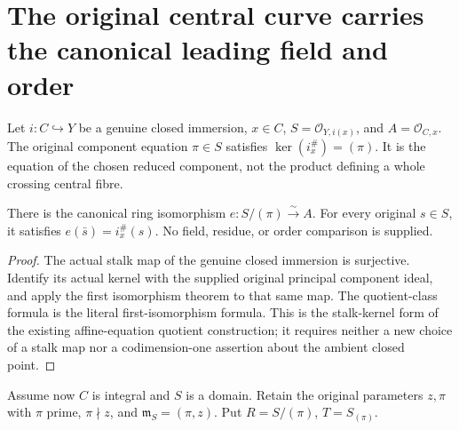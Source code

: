 \section{The original central curve carries the canonical leading field and order}

Let \(i:C\hookrightarrow Y\) be a genuine closed immersion, \(x\in C\),
\(S=\mathcal O_{Y,i(x)}\), and \(A=\mathcal O_{C,x}\).
The original component equation \(\pi\in S\) satisfies
\(\ker(i_x^\#)=(\pi)\). It is the equation of the chosen reduced component,
not the product defining a whole crossing central fibre.

\begin{definition}
\label{def:central-curve-original-stalk-quotient}
\leanok
There is the canonical ring isomorphism
\(e:S/(\pi)\xrightarrow{\sim}A\).
For every original \(s\in S\), it satisfies
\(e(\bar s)=i_x^\#(s)\).
No field, residue, or order comparison is supplied.
\end{definition}
\begin{proof}
The actual stalk map of the genuine closed immersion is surjective.
Identify its actual kernel with the supplied original principal component
ideal, and apply the first isomorphism theorem to that same map.
The quotient-class formula is the literal first-isomorphism formula.
This is the stalk-kernel form of the existing affine-equation quotient
construction; it requires neither a new choice of a stalk map nor a
codimension-one assertion about the ambient closed point.
\end{proof}

Assume now \(C\) is integral and \(S\) is a domain. Retain the original
parameters \(z,\pi\) with \(\pi\) prime, \(\pi\nmid z\), and
\(\mathfrak m_S=(\pi,z)\). Put \(R=S/(\pi)\), \(T=S_{(\pi)}\).

